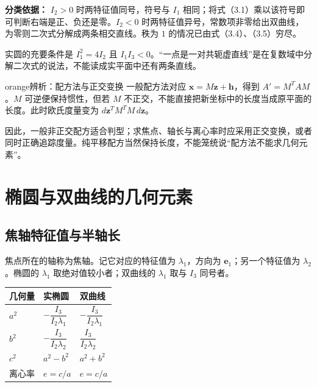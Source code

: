 \documentclass[11pt,a4paper]{article}
\begin{document}
\textbf{分类依据：} \(I_2>0\) 时两特征值同号，符号与 \(I_1\)
相同；将式（3.1）乘以该符号即可判断右端是正、负还是零。\(I_2<0\)
时两特征值异号，常数项非零给出双曲线，为零则二次式分解成两条相交直线。秩为
\(1\) 的情况已由式（3.4）、（3.5）穷尽。

实圆的充要条件是 \(I_1^2=4I_2\) 且
\(I_1I_3<0\)。``一点是一对共轭虚直线''是在复数域中分解二次式的说法，不能读成实平面中还有两条直线。

\begin{sboxenv}{orange}{辨析：配方法与正交变换}
一般配方法对应 \(\boldsymbol x=M\boldsymbol z+\boldsymbol h\)，得到
\(A'=M^TAM\)。\(M\) 可逆便保持惯性，但若 \(M\)
不正交，不能直接把新坐标中的长度当成原平面的长度。此时欧氏度量变为
\(d\boldsymbol z^TM^TM\,d\boldsymbol z\)。

因此，一般非正交配方适合判型；求焦点、轴长与离心率时应采用正交变换，或者同时正确追踪度量。纯平移配方当然保持长度，不能笼统说``配方法不能求几何元素''。

\end{sboxenv}

\section{椭圆与双曲线的几何元素}\label{ux692dux5706ux4e0eux53ccux66f2ux7ebfux7684ux51e0ux4f55ux5143ux7d20}

\subsection{焦轴特征值与半轴长}\label{ux7126ux8f74ux7279ux5f81ux503cux4e0eux534aux8f74ux957f}

焦点所在的轴称为焦轴。记它对应的特征值为 \(\lambda_1\)，方向为
\(\boldsymbol e_1\)；另一个特征值为 \(\lambda_2\)。椭圆的 \(\lambda_1\)
取绝对值较小者；双曲线的 \(\lambda_1\) 取与 \(I_3\) 同号者。

\begin{longtable}[]{@{}lll@{}}
\toprule\noalign{}
几何量 & 实椭圆 & 双曲线 \\
\midrule\noalign{}
\endhead
\bottomrule\noalign{}
\endlastfoot
\(a^2\) & \(-\dfrac{I_3}{I_2\lambda_1}\) &
\(-\dfrac{I_3}{I_2\lambda_1}\) \\
\(b^2\) & \(-\dfrac{I_3}{I_2\lambda_2}\) &
\(\dfrac{I_3}{I_2\lambda_2}\) \\
\(c^2\) & \(a^2-b^2\) & \(a^2+b^2\) \\
离心率 & \(e=c/a\) & \(e=c/a\) \\
\end{longtable}
\end{document}
